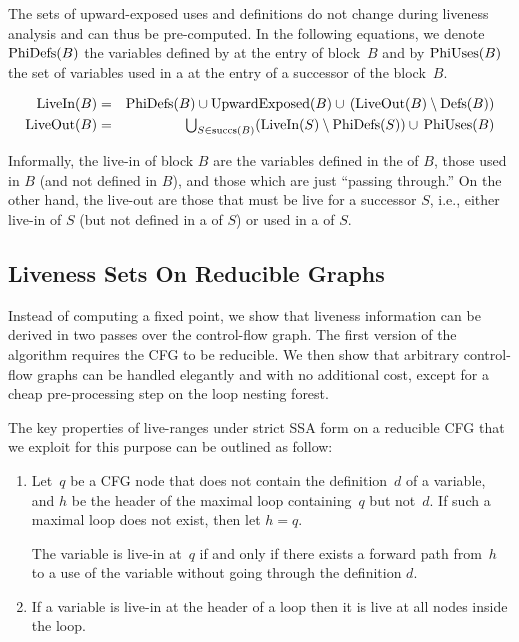 The sets of upward-exposed uses and definitions do not change during liveness analysis and can thus be pre-computed.
%
In the following equations, we denote $\textrm{PhiDefs}(B)$ the variables defined by \phifuns at the entry of block~$B$ and by $\textrm{PhiUses}(B)$ the set of variables used in a \phifun at the entry of a successor of the block~$B$.

\begin{eqnarray*}
	\textrm{LiveIn}(B) & = & \textrm{PhiDefs}(B) \cup \textrm{UpwardExposed}(B) \cup \,(\textrm{LiveOut}(B)\setminus \textrm{Defs}(B)) \\
	\textrm{LiveOut}(B)& = &
	\textstyle \bigcup_{S \in \textrm{succs}(B)} (\textrm{LiveIn}(S) \setminus
	\textrm{PhiDefs}(S)) \cup\, \textrm{PhiUses}(B)
\end{eqnarray*}

Informally, the live-in of block $B$ are the variables defined in the 
\phifuns of $B$, those used in $B$ (and not defined in $B$), and those 
which are just ``passing through.'' On the other hand, the live-out are 
those that must be live for a successor $S$, i.e., either live-in of $S$ 
(but not defined in a \phifun of $S$) or used in a \phifun of $S$.


\subsection{Liveness Sets On Reducible Graphs}
\label{sec:forreducible}

Instead of computing a fixed point, we show that liveness information can be derived in two passes over the control-flow graph.
The first version of the algorithm requires the CFG to be reducible.
We then show that arbitrary control-flow graphs can be handled elegantly and with no additional cost, except for a cheap pre-processing step on the loop nesting forest.

The key properties of live-ranges under strict SSA form on a reducible CFG that 
we exploit for this purpose %
can be outlined as follow:
\begin{enumerate}
  \item
    Let~$q$ be a CFG node that does not contain the definition~$d$ of 
    a variable, and $h$ be the header of the maximal loop containing~$q$ 
    but not~$d$.
    If such a maximal loop does not exist, then let $h=q$.

    The variable is live-in at~$q$ if and only if there exists a forward path 
    from~$h$ to a use of the variable without going through the definition $d$.

  \item
    If a variable is live-in at the header of a loop then it is live at all 
    nodes inside the loop.
\end{enumerate}

